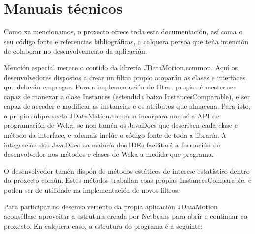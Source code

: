 \chapter{Manuais técnicos}

Como xa mencionamos, o proxecto ofrece toda esta documentación, así coma o seu código fonte e referencias bibliográficas, a calquera persoa que teña intención de colaborar no desenvolvemento da aplicación.

Mención especial merece o contido da librería JDataMotion.common. Aquí os desenvolvedores dispostos a crear un filtro propio atoparán as clases e interfaces que deberán empregar. Para a implementación de filtros propios é mester ser capaz de manexar a clase Instances (estendida baixo InstancesComparable), e ser capaz de acceder e modificar as instancias e os atributos que almacena. Para isto, o propio subproxecto JDataMotion.common incorpora non só a API de programación de Weka, se non tamén os JavaDocs que describen cada clase e método da interface, e ademais inclúe o código fonte de toda a libraría. A integración dos JavaDocs na maioría dos IDEs facilitará a formación do desenvolvedor nos métodos e clases de Weka a medida que programa.

O desenvolvedor tamén dispón de métodos estáticos de interese estatístico dentro do proxecto común. Estes métodos traballan coas propias InstancesComparable, e poden ser de utilidade na implementación de novos filtros.

Para participar no desenvolvemento da propia aplicación JDataMotion aconséllase aproveitar a estrutura creada por Netbeans para abrir e continuar co proxecto. En calquera caso, a estrutura do programa é a seguinte:

